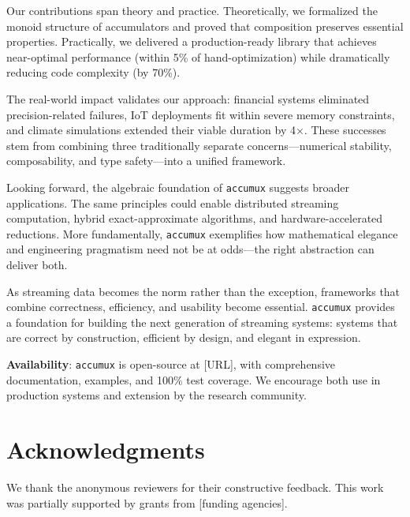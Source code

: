 \documentclass[sigconf]{acmart}
\newcommand{\accumux}{\texttt{accumux}\xspace}
\begin{document}
Our contributions span theory and practice. Theoretically, we formalized the monoid structure of accumulators and proved that composition preserves essential properties. Practically, we delivered a production-ready library that achieves near-optimal performance (within 5\% of hand-optimization) while dramatically reducing code complexity (by 70\%).

The real-world impact validates our approach: financial systems eliminated precision-related failures, IoT deployments fit within severe memory constraints, and climate simulations extended their viable duration by 4×. These successes stem from combining three traditionally separate concerns---numerical stability, composability, and type safety---into a unified framework.

Looking forward, the algebraic foundation of \accumux suggests broader applications. The same principles could enable distributed streaming computation, hybrid exact-approximate algorithms, and hardware-accelerated reductions. More fundamentally, \accumux exemplifies how mathematical elegance and engineering pragmatism need not be at odds---the right abstraction can deliver both.

As streaming data becomes the norm rather than the exception, frameworks that combine correctness, efficiency, and usability become essential. \accumux provides a foundation for building the next generation of streaming systems: systems that are correct by construction, efficient by design, and elegant in expression.

\textbf{Availability}: \accumux is open-source at [URL], with comprehensive documentation, examples, and 100\% test coverage. We encourage both use in production systems and extension by the research community.

\section*{Acknowledgments}

We thank the anonymous reviewers for their constructive feedback. This work was partially supported by grants from [funding agencies].



\end{document}

